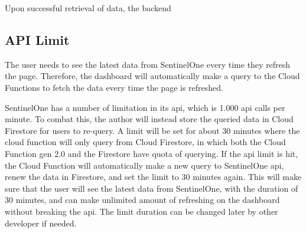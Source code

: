 Upon successful retrieval of data, the backend

\subsection{API Limit}

The user needs to see the latest data from SentinelOne every time they refresh the page. Therefore, the dashboard will automatically
make a query to the Cloud Functions to fetch the data every time the page is refreshed.

SentinelOne has a number of limitation in its \acrshort{api}, which is 1.000 \acrshort{api} calls per minute. To combat this, the author
will instead store the queried data in Cloud Firestore for users to re-query. A limit will be set for about 30 minutes where the cloud
function will only query from Cloud Firestore, in which both the Cloud Function gen 2.0 and the Firestore have quota of querying. If
the \acrshort{api} limit is hit, the Cloud Function will automatically make a new query to SentinelOne \acrshort{api}, renew the data
in Firestore, and set the limit to 30 minutes again. This will make sure that the user will see the latest data from SentinelOne, with
the duration of 30 minutes, and can make unlimited amount of refreshing on the dashboard without breaking the \acrshort{api}. The limit
duration can be changed later by other developer if needed.

